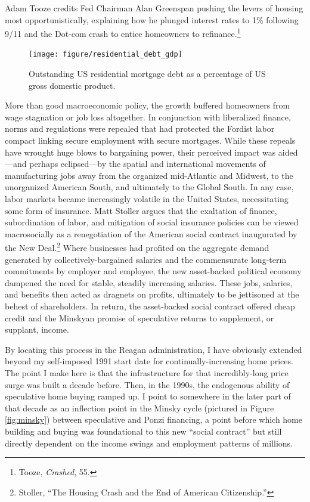 \documentclass[12pt,oneside]{psthesis}
\begin{document}
Adam Tooze credits Fed Chairman Alan Greenspan pushing the levers of housing most opportunistically, explaining how he plunged interest rates to 1\% following 9/11 and the Dot-com crash to entice homeowners to refinance.\footnote{Tooze, \emph{Crashed}, 55.}
\begin{figure}

{\centering \texttt{[image: figure/residential\_debt\_gdp]} 

}

\caption{Outstanding US residential mortgage debt as a percentage of US gross domestic product.}\label{fig:hhdebt}
\end{figure}
More than good macroeconomic policy, the growth buffered homeowners from wage stagnation or job loss altogether.
In conjunction with liberalized finance, norms and regulations were repealed that had protected the Fordist labor compact linking secure employment with secure mortgages.
While these repeals have wrought huge blows to bargaining power, their perceived impact was aided---and perhaps eclipsed---by the spatial and international movements of manufacturing jobs away from the organized mid-Atlantic and Midwest, to the unorganized American South, and ultimately to the Global South.
In any case, labor markets became increasingly volatile in the United States, necessitating some form of insurance.
Matt Stoller argues that the exaltation of finance, subordination of labor, and mitigation of social insurance policies can be viewed macrosocially as a renegotiation of the American social contract inaugurated by the New Deal.\footnote{Stoller, ``The Housing Crash and the End of American Citizenship.''}
Where businesses had profited on the aggregate demand generated by collectively-bargained salaries and the commensurate long-term commitments by employer and employee, the new asset-backed political economy dampened the need for stable, steadily increasing salaries.
These jobs, salaries, and benefits then acted as dragnets on profits, ultimately to be jettisoned at the behest of shareholders.
In return, the asset-backed social contract offered cheap credit and the Minskyan promise of speculative returns to supplement, or supplant, income.

By locating this process in the Reagan administration, I have obviously extended beyond my self-imposed 1991 start date for continually-increasing home prices.
The point I make here is that the infrastructure for that incredibly-long price surge was built a decade before.
Then, in the 1990s, the endogenous ability of speculative home buying ramped up.
I point to somewhere in the later part of that decade as an inflection point in the Minsky cycle (pictured in Figure \ref{fig:minsky}) between speculative and Ponzi financing, a point before which home building and buying was foundational to this new ``social contract'' but still directly dependent on the income swings and employment patterns of millions.
\end{document}
